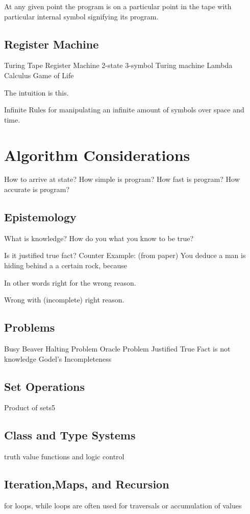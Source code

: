 \documentclass{book}
\begin{document}
At any given point the program is on a particular point in the tape with particular internal symbol signifying its program.



\section{Register Machine}
Turing Tape
Register Machine
2-state 3-symbol Turing machine
Lambda Calculus
Game of Life

The intuition is this.

Infinite Rules for manipulating an infinite amount of symbols over space and time.  



\chapter{Algorithm Considerations}
How to arrive at state?
How simple is program?
How fast is program?
How accurate is program?


\section{Epistemology}
What is knowledge?
How do you what you know to be true?

Is it justified true fact?
Counter Example:
(from paper) You deduce a man is hiding behind a a certain rock, because

In other words right for the wrong reason.

Wrong with (incomplete) right reason.


\section{Problems}
Busy Beaver
Halting Problem
Oracle Problem
Justified True Fact is not knowledge
Godel's Incompleteness


\section{Set Operations}
Product of sets5

\section{Class and Type Systems}

truth value functions and logic control
\section{Iteration,Maps, and Recursion}
for loops, while loops are often used for traversals or
accumulation of values
\end{document}
